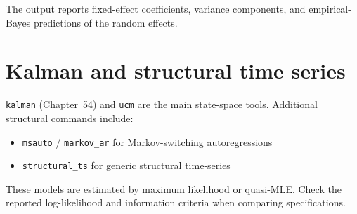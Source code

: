 The output reports fixed-effect coefficients, variance components, and
empirical-Bayes predictions of the random effects.

\section{Kalman and structural time series}

\texttt{kalman} (Chapter~54) and \texttt{ucm} are the main state-space tools.
Additional structural commands include:

\begin{itemize}
\item \texttt{msauto} / \texttt{markov\_ar} for Markov-switching autoregressions
\item \texttt{structural\_ts} for generic structural time-series
\end{itemize}

These models are estimated by maximum likelihood or quasi-MLE. Check the
reported log-likelihood and information criteria when comparing
specifications.
